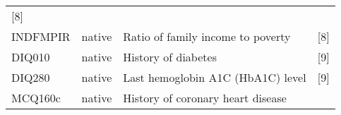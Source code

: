 \documentclass[]{article}
\begin{document}
\begin{longtable}[]{@{}llll@{}}
\begin{minipage}[t]{0.31\columnwidth}
{[}8{]}\strut
\end{minipage}\tabularnewline
\begin{minipage}[t]{0.10\columnwidth}\raggedright
INDFMPIR\strut
\end{minipage} & \begin{minipage}[t]{0.05\columnwidth}\raggedright
native\strut
\end{minipage} & \begin{minipage}[t]{0.43\columnwidth}\raggedright
Ratio of family income to poverty\strut
\end{minipage} & \begin{minipage}[t]{0.31\columnwidth}\raggedright
{[}8{]}\strut
\end{minipage}\tabularnewline
\begin{minipage}[t]{0.10\columnwidth}\raggedright
DIQ010\strut
\end{minipage} & \begin{minipage}[t]{0.05\columnwidth}\raggedright
native\strut
\end{minipage} & \begin{minipage}[t]{0.43\columnwidth}\raggedright
History of diabetes\strut
\end{minipage} & \begin{minipage}[t]{0.31\columnwidth}\raggedright
{[}9{]}\strut
\end{minipage}\tabularnewline
\begin{minipage}[t]{0.10\columnwidth}\raggedright
DIQ280\strut
\end{minipage} & \begin{minipage}[t]{0.05\columnwidth}\raggedright
native\strut
\end{minipage} & \begin{minipage}[t]{0.43\columnwidth}\raggedright
Last hemoglobin A1C (HbA1C) level\strut
\end{minipage} & \begin{minipage}[t]{0.31\columnwidth}\raggedright
{[}9{]}\strut
\end{minipage}\tabularnewline
\begin{minipage}[t]{0.10\columnwidth}\raggedright
MCQ160c\strut
\end{minipage} & \begin{minipage}[t]{0.05\columnwidth}\raggedright
native\strut
\end{minipage} & \begin{minipage}[t]{0.43\columnwidth}\raggedright
History of coronary heart disease\strut
\end{minipage} & \begin{minipage}[t]{0.31\columnwidth}\raggedright

\end{minipage}
\end{longtable}
\end{document}

